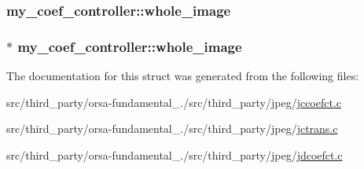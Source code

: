 \subsubsection[{whole\+\_\+image}]{ my\+\_\+coef\+\_\+controller\+::whole\+\_\+image}\label{structmy__coef__controller_aedc0b0cdda57a7f9e8c49770995b12b4}
\hypertarget{structmy__coef__controller_a7e6db8186140ced6ed561b2860c84819}{}
\subsubsection[{whole\+\_\+image}]{$\ast$ my\+\_\+coef\+\_\+controller\+::whole\+\_\+image}\label{structmy__coef__controller_a7e6db8186140ced6ed561b2860c84819}


The documentation for this struct was generated from the following files\+:\begin{DoxyCompactItemize}
\item 
src/third\+\_\+party/orsa-\/fundamental\+\_./src/third\+\_\+party/jpeg/\hyperlink{jccoefct_8c}{jccoefct.\+c}\item 
src/third\+\_\+party/orsa-\/fundamental\+\_./src/third\+\_\+party/jpeg/\hyperlink{jctrans_8c}{jctrans.\+c}\item 
src/third\+\_\+party/orsa-\/fundamental\+\_./src/third\+\_\+party/jpeg/\hyperlink{jdcoefct_8c}{jdcoefct.\+c}\end{DoxyCompactItemize}
